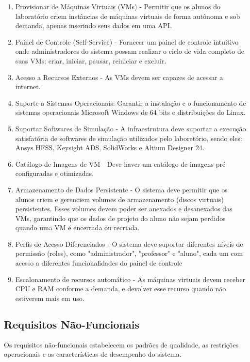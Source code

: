 \begin{enumerate}
\item Provisionar de Máquinas Virtuais (VMs) - Permitir que os alunos do laboratório criem instâncias de máquinas virtuais de forma autônoma e sob demanda, apenas inserindo seus dados em uma API. 
\item Painel de Controle (Self-Service) - Fornecer um painel de controle intuitivo onde administradores do sistema possam realizar o ciclo de vida completo de suas VMs: criar, iniciar, pausar, reiniciar e excluir.
\item Acesso a Recursos Externos - As VMs devem ser capazes de acessar a internet.
\item Suporte a Sistemas Operacionais: Garantir a instalação e o funcionamento de sistemas operacionais Microsoft Windows de 64 bits e distribuições do Linux.
\item Suportar Softwares de Simulação - A infraestrutura deve suportar a execução satisfatória de softwares de simulação utilizados pelo laboretório, sendo eles: Ansys HFSS, Keysight ADS, SolidWorks e Altium Designer 24.
\item Catálogo de Imagens de VM - Deve haver um catálogo de imagens pré-configuradas e otimizadas.
\item Armazenamento de Dados Persistente - O sistema deve permitir que os alunos criem e gerenciem volumes de armazenamento (discos virtuais) persistentes. Esses volumes devem poder ser anexados e desanexados das VMs, garantindo que os dados de projeto do aluno não sejam perdidos quando uma VM é encerrada ou recriada.
\item Perfis de Acesso Diferenciados - O sistema deve suportar diferentes níveis de permissão (roles), como "administrador", "professor" e "aluno", cada um com acesso a diferentes funcionalidades do painel de controle
\item Escalonamento de recursos automático - As máquinas virtuais devem receber CPU e RAM conforme a demanda, e devolver esse recurso quando não estiverem mais em uso.
\end{enumerate}

\subsection{Requisitos Não-Funcionais}
Os requisitos não-funcionais estabelecem os padrões de qualidade, as restrições operacionais e as características de desempenho do sistema.

